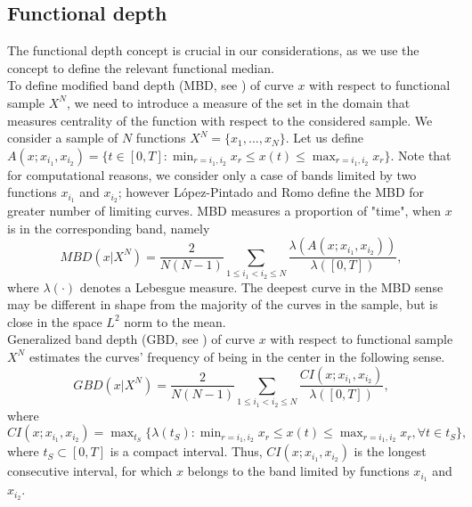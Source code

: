 \documentclass[12pt,a4paper]{article}
\numberwithin{equation}{section}
\begin{document}
\subsection{Functional depth}
The functional depth concept \cite{Nagy,Nieto} is crucial in our considerations, as we use the concept to define the relevant functional median.
\\ To define modified band depth (MBD, see \cite{LopezRomo}) of curve $x$ with respect to functional sample $X^N$, we need to introduce a measure of the set in the domain that measures centrality of the function with respect to the considered sample. %
We consider a sample of $N$ functions $X^N=\{x_1,...,x_N\}$. Let us define $A(x;x_{i_1},x_{i_2})=\{t\in[0,T]:  \min_{r=i_1,i_2} x_{r}\leq x(t)\leq \max_{r=i_1,i_2} x_{r} \}.$ 
Note that for computational reasons, we consider only a case of bands limited by two functions $x_{i_1}$ and $x_{i_2}$; however L\'opez-Pintado and Romo \cite{LopezRomo} define the MBD for greater number of limiting curves. MBD measures a proportion of "time", when $x$ is in the corresponding band, namely
\begin{equation}
MBD(x|X^N)=\frac{2}{N(N-1)}\sum_{1\leq i_1< i_2\leq N} \frac{\lambda(A(x;x_{i_1},x_{i_2}))}{\lambda([0,T])},
\end{equation}
where $\lambda(\cdot)$ denotes a Lebesgue measure.
The deepest curve in the MBD sense may be different in shape from the majority of the curves in the sample, but is close in the space $L^2$ norm to the mean.
\\ Generalized band depth (GBD, see \cite{Lopez}) of curve $x$ with respect to functional sample $X^N$ estimates the curves' frequency of being in the center in the following sense. %
\begin{equation}
GBD(x|X^N)=\frac{2}{N(N-1)}\sum_{1\leq i_1< i_2\leq N} \frac{CI(x;x_{i_1},x_{i_2})}{\lambda([0,T])},
\end{equation}
where $CI(x;x_{i_1},x_{i_2})=\max_{t_S}\{\lambda(t_S) : \min_{r=i_1,i_2} x_{r}\leq x(t)\leq \max_{r=i_1,i_2} x_{r}, \forall t\in t_S \},$ where $t_S\subset[0,T]$ is a compact interval. Thus, $CI(x;x_{i_1},x_{i_2})$ is the longest consecutive interval, for which $x$ belongs to the band limited by functions $x_{i_1}$ and $x_{i_2}$.
\end{document}
